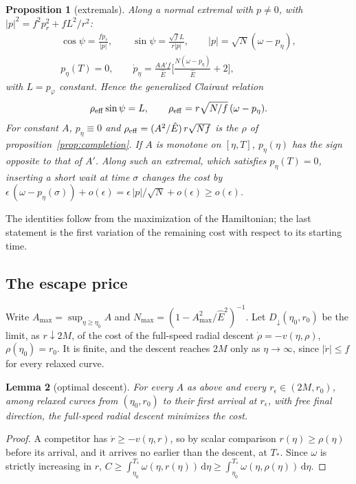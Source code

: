 \documentclass[aip,jmp,amsmath,amssymb,reprint]{revtex4-2}
\newcommand{\Ehat}{\hat E}
\newcommand{\dd}{\mathrm{d}}
\theoremstyle{plain}
\newtheorem{proposition}{Proposition}[section]
\newtheorem{lemma}[proposition]{Lemma}
\theoremstyle{definition}
\begin{document}
\begin{proposition}[extremals]\label{prop:tau-pmp}
Along a normal extremal with $p\neq0$, with $|p|^2=f^2p_r^2+fL^2/r^2$:
\[
\begin{gathered}
  \cos\psi=\frac{fp_r}{|p|},\qquad \sin\psi=\frac{\sqrt fL}{r|p|},\qquad
  |p|=\sqrt N(\omega-p_\eta),\\
  p_\eta(T)=0,\qquad
  \dot p_\eta=\frac{AA'f}{\Ehat}\Big[\frac{N(\omega-p_\eta)}{\Ehat}+2\Big],
\end{gathered}
\]
with $L=p_\varphi$ constant. Hence the generalized Clairaut relation
\[
  \rho_{\rm eff}\sin\psi=L,\qquad \rho_{\rm eff}=r\sqrt{N/f}\,(\omega-p_\eta).
\]
For constant $A$, $p_\eta\equiv0$ and $\rho_{\rm eff}=(A^2/\Ehat)\,r\sqrt{Nf}$ is the $\rho$ of
proposition~\ref{prop:completion}. If $A$ is monotone on $[\eta,T]$, $p_\eta(\eta)$ has the sign
opposite to that of $A'$. Along such an extremal, which satisfies $p_\eta(T)=0$, inserting a short
wait at time $\sigma$ changes the cost by
$\epsilon\,(\omega-p_\eta(\sigma))+o(\epsilon)=\epsilon\,|p|/\sqrt N+o(\epsilon)\ge o(\epsilon)$.
\end{proposition}

The identities follow from the maximization of the Hamiltonian; the last statement is the
first variation of the remaining cost with respect to its starting time.

\subsection{The escape price}
Write $A_{\max}=\sup_{\eta\ge\eta_0}A$ and $N_{\max}=(1-A_{\max}^2/\Ehat^2)^{-1}$.
Let $D_\downarrow(\eta_0,r_0)$ be the limit, as $r\downarrow2M$, of the cost of the full-speed radial
descent $\dot\rho=-v(\eta,\rho)$, $\rho(\eta_0)=r_0$. It is finite, and the descent reaches $2M$ only
as $\eta\to\infty$, since $|\dot r|\le f$ for every relaxed curve.

\begin{lemma}[optimal descent]\label{lem:descent}
For every $A$ as above and every $r_\epsilon\in(2M,r_0)$, among relaxed curves from
$(\eta_0,r_0)$ to their first arrival at $r_\epsilon$, with free final direction, the full-speed
radial descent minimizes the cost.
\end{lemma}

\begin{proof}
A competitor has $\dot r\ge-v(\eta,r)$, so by scalar comparison $r(\eta)\ge\rho(\eta)$ before its
arrival, and it arrives no earlier than the descent, at $T_*$. Since $\omega$ is strictly
increasing in $r$,
$C\ge\int_{\eta_0}^{T_*}\omega(\eta,r(\eta))\,\dd\eta\ge\int_{\eta_0}^{T_*}\omega(\eta,\rho(\eta))\,\dd\eta$.
\end{proof}
\end{document}
